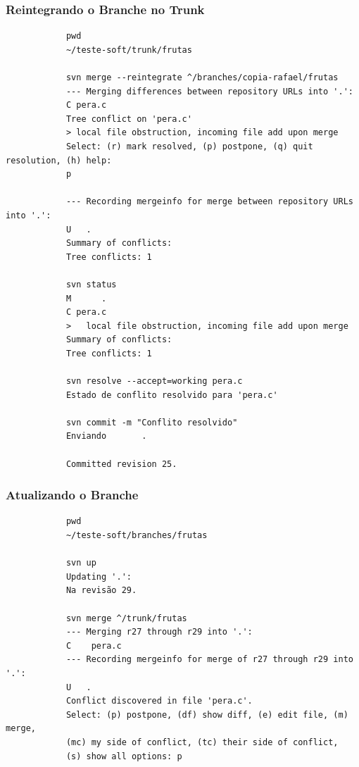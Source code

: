 \documentclass{beamer}
\begin{document}
\begin{frame}[fragile]
    \frametitle{Reintegrando o Branche no Trunk}

    \begin{bash}{}
        {\tiny
            \begin{verbatim}
            pwd
            ~/teste-soft/trunk/frutas

            svn merge --reintegrate ^/branches/copia-rafael/frutas
            --- Merging differences between repository URLs into '.':
            C pera.c
            Tree conflict on 'pera.c'
            > local file obstruction, incoming file add upon merge
            Select: (r) mark resolved, (p) postpone, (q) quit resolution, (h) help: 
            p

            --- Recording mergeinfo for merge between repository URLs into '.':
            U   .
            Summary of conflicts:
            Tree conflicts: 1

            svn status
            M      .
            C pera.c
            >   local file obstruction, incoming file add upon merge
            Summary of conflicts:
            Tree conflicts: 1

            svn resolve --accept=working pera.c
            Estado de conflito resolvido para 'pera.c'

            svn commit -m "Conflito resolvido"
            Enviando       .

            Committed revision 25.
            \end{verbatim}
        }
    \end{bash}

\end{frame}

\begin{frame}[fragile]
    \frametitle{Atualizando o Branche}

    \begin{bash}{}
        {\tiny
            \begin{verbatim}
            pwd
            ~/teste-soft/branches/frutas

            svn up
            Updating '.':
            Na revisão 29.

            svn merge ^/trunk/frutas
            --- Merging r27 through r29 into '.':
            C    pera.c
            --- Recording mergeinfo for merge of r27 through r29 into '.':
            U   .
            Conflict discovered in file 'pera.c'.
            Select: (p) postpone, (df) show diff, (e) edit file, (m) merge,
            (mc) my side of conflict, (tc) their side of conflict,
            (s) show all options: p

            \end{verbatim}
        }
    \end{bash}

\end{frame}
\end{document}

